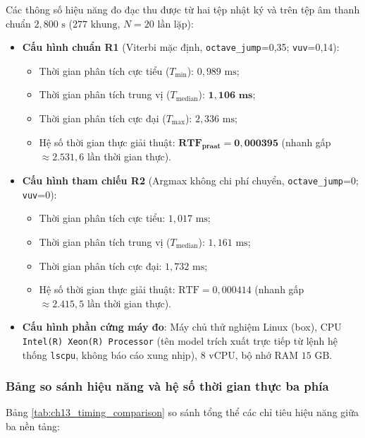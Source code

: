 Các thông số hiệu năng đo đạc thu được từ hai tệp nhật ký  và  trên tệp âm thanh chuẩn $2{,}800\text{ s}$ ($277\text{ khung}$, $N = 20\text{ lần lặp}$):
\begin{itemize}
    \item \textbf{Cấu hình chuẩn R1} (Viterbi mặc định, \texttt{octave\_jump}=0,35; \texttt{vuv}=0,14):
    \begin{itemize}
        \item Thời gian phân tích cực tiểu ($T_{\min}$): $0{,}989\text{ ms}$;
        \item Thời gian phân tích trung vị ($T_{\text{median}}$): $\mathbf{1{,}106\text{ ms}}$;
        \item Thời gian phân tích cực đại ($T_{\max}$): $2{,}336\text{ ms}$;
        \item Hệ số thời gian thực giải thuật: $\mathbf{\text{RTF}_{\text{praat}} = 0{,}000395}$ (nhanh gấp $\approx 2.531{,}6\text{ lần}$ thời gian thực).
    \end{itemize}
    \item \textbf{Cấu hình tham chiếu R2} (Argmax không chi phí chuyển, \texttt{octave\_jump}=0; \texttt{vuv}=0):
    \begin{itemize}
        \item Thời gian phân tích cực tiểu: $1{,}017\text{ ms}$;
        \item Thời gian phân tích trung vị ($T_{\text{median}}$): $1{,}161\text{ ms}$;
        \item Thời gian phân tích cực đại: $1{,}732\text{ ms}$;
        \item Hệ số thời gian thực giải thuật: $\text{RTF} = 0{,}000414$ (nhanh gấp $\approx 2.415{,}5\text{ lần}$ thời gian thực).
    \end{itemize}
    \item \textbf{Cấu hình phần cứng máy đo}: Máy chủ thử nghiệm Linux (box), CPU \texttt{Intel(R) Xeon(R) Processor} (tên model trích xuất trực tiếp từ lệnh hệ thống \texttt{lscpu}, không báo cáo xung nhịp), $8\text{ vCPU}$, bộ nhớ RAM $15\text{ GB}$.
\end{itemize}

\subsubsection*{Bảng so sánh hiệu năng và hệ số thời gian thực ba phía}
Bảng \ref{tab:ch13_timing_comparison} so sánh tổng thể các chỉ tiêu hiệu năng giữa ba nền tảng:

